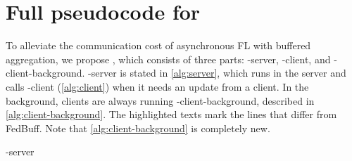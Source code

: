 \section{Full pseudocode for \algname}
\label{appsec:pseudocode}
To alleviate the communication cost of asynchronous FL with buffered aggregation, we propose \algname, which consists of three parts: \algname-server, \algname-client, and \algname-client-background.
\algname-server is stated in \cref{alg:server}, which runs in the server and calls \algname-client (\cref{alg:client}) when it needs an update from a client.
In the background, clients are always running \algname-client-background, described in \cref{alg:client-background}.
The highlighted texts mark the lines that differ from FedBuff.
Note that \cref{alg:client-background} is completely new.

\begin{algorithm}[p]
    \caption{\algname-server} \label{alg:server}
    \begin{algorithmic}[1]
        \STATE {}
        \REPEAT
         \hfill{}
        \ENDIF
        \STATE {}
        \ENDIF
    \end{algorithmic}
\end{algorithm}

